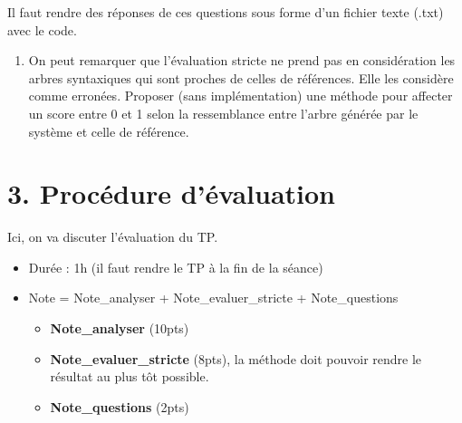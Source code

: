 \documentclass[11pt, a4paper]{article}
\begin{document}
Il faut rendre des réponses de ces questions sous forme d'un fichier texte (.txt) avec le code.

\begin{enumerate}
	\item On peut remarquer que l'évaluation stricte ne prend pas en considération les arbres syntaxiques qui sont proches de celles de références. Elle les considère comme erronées. Proposer (sans implémentation) une méthode pour affecter un score entre 0 et 1 selon la ressemblance entre l'arbre générée par le système et celle de référence.
\end{enumerate}

\newpage
\section*{3. Procédure d'évaluation}

Ici, on va discuter l'évaluation du TP.

\begin{itemize}
	\item Durée : 1h (il faut rendre le TP à la fin de la séance)
	\item Note = Note\_analyser + Note\_evaluer\_stricte + Note\_questions
	\begin{itemize}
		\item \textbf{Note\_analyser} (10pts) 
		\item \textbf{Note\_evaluer\_stricte} (8pts), la méthode doit pouvoir rendre le résultat au plus tôt possible.
		\item \textbf{Note\_questions} (2pts)
	\end{itemize}
\end{itemize}
\end{document}
